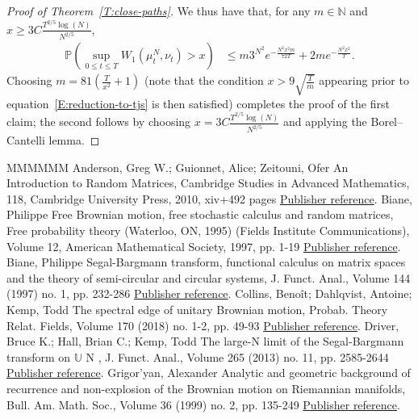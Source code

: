 \documentclass[11pt]{article}
\theoremstyle{definition}
\numberwithin{equation}{section}
\numberwithin{figure}{section}
\numberwithin{table}{section}
\newcommand{\Prob}{\mathbb{P}}
\begin{document}
\begin{proof}[Proof of Theorem~\ref{T:close-paths}]
We thus have that, for any $m\in\mathbb{N}$ and $x\ge 3C\frac{T^{2/5}\log(N)}{N^{2/5}}$,
\begin{align*}
\Prob\left(\sup_{0\le t\le
T}W_1(\mu^N_t,\nu_t)>x\right)&
\le m3^{N^2}e^{-\frac{N^2x^2m}{72T}}+2me^{-\frac{N^2x^2}{T}}.
\end{align*}
Choosing $m=81\left(\frac{T}{x^2}+1\right)$ (note that the condition $x>9\sqrt{\frac{T}{m}}$ appearing prior to equation~\ref{E:reduction-to-tjs} is then satisfied) completes the proof of the first claim; the second follows by choosing $x=3C\frac{T^{2/5}\log(N)}{N^{2/5}}$ and applying the Borel--Cantelli lemma.
\end{proof}



\begin{thebibliography}{MMMMMM}
 Anderson, Greg W.; Guionnet, Alice; Zeitouni, Ofer An Introduction to Random Matrices, Cambridge Studies in Advanced Mathematics, 118, Cambridge University Press, 2010, xiv+492 pages \href{https://ahl.centre-mersenne.org/item/AHL_2018__1__247_0/#AGZ}{Publisher reference}.
 Biane, Philippe Free Brownian motion, free stochastic calculus and random matrices, Free probability theory (Waterloo, ON, 1995) (Fields Institute Communications), Volume 12, American Mathematical Society, 1997, pp. 1-19 \href{https://ahl.centre-mersenne.org/item/AHL_2018__1__247_0/#Biane1997}{Publisher reference}.
 Biane, Philippe Segal-Bargmann transform, functional calculus on matrix spaces and the theory of semi-circular and circular systems, J. Funct. Anal., Volume 144 (1997) no. 1, pp. 232-286 \href{https://ahl.centre-mersenne.org/item/AHL_2018__1__247_0/#Biane1997-2}{Publisher reference}.
 Collins, Benoît; Dahlqvist, Antoine; Kemp, Todd The spectral edge of unitary Brownian motion, Probab. Theory Relat. Fields, Volume 170 (2018) no. 1-2, pp. 49-93 \href{https://ahl.centre-mersenne.org/item/AHL_2018__1__247_0/#CDK2016}{Publisher reference}.
 Driver, Bruce K.; Hall, Brian C.; Kemp, Todd The large-N limit of the Segal-Bargmann transform on \(\mathbb{U}\) N , J. Funct. Anal., Volume 265 (2013) no. 11, pp. 2585-2644 \href{https://ahl.centre-mersenne.org/item/AHL_2018__1__247_0/#DHK2013}{Publisher reference}.
 Grigor’yan, Alexander Analytic and geometric background of recurrence and non-explosion of the Brownian motion on Riemannian manifolds, Bull. Am. Math. Soc., Volume 36 (1999) no. 2, pp. 135-249 \href{https://ahl.centre-mersenne.org/item/AHL_2018__1__247_0/#Grigoryan1999}{Publisher reference}.

\end{thebibliography}
\end{document}
